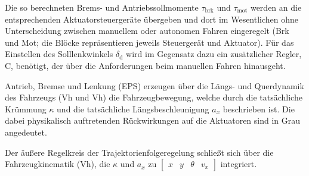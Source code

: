 Die so berechneten Brems- und Antriebssollmomente $\tau_\mathrm{brk}$ und $\tau_\mathrm{mot}$ werden an die entsprechenden Aktuatorsteuergeräte übergeben und dort im Wesentlichen ohne Unterscheidung zwischen manuellem oder autonomen Fahren eingeregelt (Brk und Mot; die Blöcke repräsentieren jeweils Steuergerät und Aktuator). Für das Einstellen des Solllenkwinkels $\delta_\mathrm d$ wird im Gegensatz dazu ein zusätzlicher Regler, C\sus{$\delta$}, benötigt, der über die Anforderungen beim manuellen Fahren hinausgeht. 

Antrieb, Bremse und Lenkung (EPS) erzeugen über die Längs- und Querdynamik des Fahrzeugs (Vh und Vh) die Fahrzeugbewegung, welche durch die tatsächliche Krümmung 
$\kappa$ und die tatsächliche Längsbeschleunigung $a_x$ beschrieben ist. Die dabei physikalisch auftretenden Rückwirkungen auf die Aktuatoren sind in Grau angedeutet.

Der äußere Regelkreis der Trajektorienfolgeregelung schließt sich über die Fahrzeugkinematik (Vh), die $\kappa$ und $a_x$ zu $\begin{bmatrix}x & y & \theta & v_x\end{bmatrix}$ integriert.

\FloatBarrier


